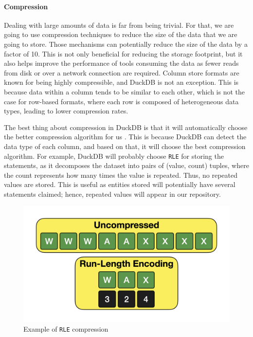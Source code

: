\paragraph{Compression}

Dealing with large amounts of data is far from being trivial. For that, we are going to use compression techniques to reduce the size of the data that we are going to store. Those mechanisms can potentially reduce the size of the data by a factor of 10. This is not only beneficial for reducing the storage footprint, but it also helps improve the performance of tools consuming the data as fewer reads from disk or over a network connection are required. Column store formats are known for being highly compressible, and DuckDB is not an exception. This is because data within a column tends to be similar to each other, which is not the case for row-based formats, where each row is composed of heterogeneous data types, leading to lower compression rates.

The best thing about compression in DuckDB is that it will automatically choose the better compression algorithm for us \cite{Raasveldt_2022}. This is because DuckDB can detect the data type of each column, and based on that, it will choose the best compression algorithm. For example, DuckDB will probably choose \texttt{RLE} for storing the statements, as it decomposes the dataset into pairs of (value, count) tuples, where the count represents how many times the value is repeated. Thus, no repeated values are stored. This is useful as entities stored will potentially have several statements claimed; hence, repeated values will appear in our repository.

\begin{figure}[ht]
    \centering
    \includegraphics[width=.8\linewidth]{figures/diagrams/10-2_rle.png}
    \caption[Example of \texttt{RLE} compression]{Example of \texttt{RLE} compression \cite{Raasveldt_2022}}
\end{figure}

